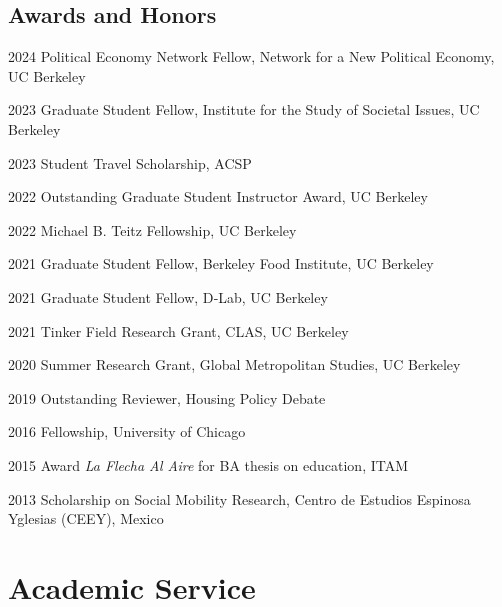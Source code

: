 \documentclass[12pt,letterpaper]{report}
\begin{document}
    \subsection*{Awards and Honors}
    \begin{tablist}
        \item[2024] \quad{}Political Economy Network Fellow, Network for a New Political Economy, UC Berkeley 
        \item[2023] \quad{}Graduate Student Fellow, Institute for the Study of Societal Issues, UC Berkeley
        \item[2023] \quad{} Student Travel Scholarship, ACSP
        \item[2022] \quad{}Outstanding Graduate Student Instructor Award, UC Berkeley
        \item[2022] \quad{}Michael B. Teitz Fellowship, UC Berkeley 
        \item[2021] \quad{}Graduate Student Fellow, Berkeley Food Institute, UC Berkeley
        \item[2021] \quad{}Graduate Student Fellow, D‐Lab, UC Berkeley
        \item[2021] \quad{}Tinker Field Research Grant, CLAS, UC Berkeley
        \item[2020] \quad{}Summer Research Grant, Global Metropolitan Studies, UC Berkeley
        \item[2019] \quad{}Outstanding Reviewer, Housing Policy Debate
        \item[2016] \quad{}Fellowship, University of Chicago
        \item[2015] \quad{}Award \textit{La Flecha Al Aire} for BA thesis on education, ITAM
        \item[2013] \quad{}Scholarship on Social Mobility Research, Centro de Estudios Espinosa Yglesias (CEEY), Mexico
    \end{tablist}
    
    \section*{Academic Service}
\end{document}
